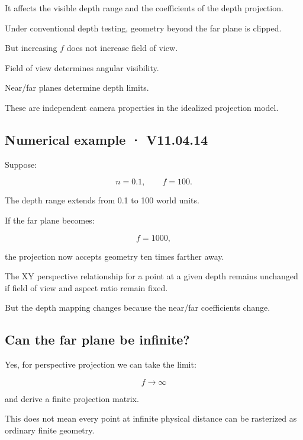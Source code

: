 \hypertarget{02-foundations-ii-ch033-what-the-far-plane-controls}{}

It affects the visible depth range and the coefficients of the depth projection.

Under conventional depth testing, geometry beyond the far plane is clipped.

But increasing \(f\) does not increase field of view.

Field of view determines angular visibility.

Near/far planes determine depth limits.

These are independent camera properties in the idealized projection model.

\subsection{Numerical example · V11.04.14}\label{02-foundations-ii-ch033-numerical-example-v11.04.14}

\hypertarget{02-foundations-ii-ch033-numerical-example-v11.04.14}{}

Suppose:

\[
 n=0.1,\qquad f=100.
\]

The depth range extends from 0.1 to 100 world units.

If the far plane becomes:

\[
 f=1000,
\]

the projection now accepts geometry ten times farther away.

The XY perspective relationship for a point at a given depth remains unchanged if field of view and aspect ratio remain fixed.

But the depth mapping changes because the near/far coefficients change.

\subsection{Can the far plane be infinite?}\label{02-foundations-ii-ch033-can-the-far-plane-be-infinite}

\hypertarget{02-foundations-ii-ch033-can-the-far-plane-be-infinite}{}

Yes, for perspective projection we can take the limit:

\[
 f\to\infty
\]

and derive a finite projection matrix.

This does not mean every point at infinite physical distance can be rasterized as ordinary finite geometry.

